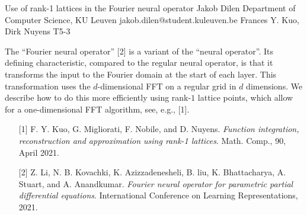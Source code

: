 \begin{talk}
\end{talk}

\begin{talk}
  {Use of rank-1 lattices in the Fourier neural operator}%
  {Jakob Dilen}%
  {Department of Computer Science, KU Leuven}%
  {jakob.dilen@student.kuleuven.be}%
  {Frances Y. Kuo, Dirk Nuyens}%
  {T5-3}%

The ``Fourier neural operator'' [2] is a variant of the ``neural operator''.
Its defining characteristic, compared to the regular neural operator, is that it transforms the input to the Fourier domain at the start of each layer. This transformation uses the $d$-dimensional FFT on a regular grid in $d$ dimensions. We describe how to do this more efficiently using rank-$1$ lattice points, which allow for a one-dimensional FFT algorithm, see, e.g., [1]. 

\medskip
\begin{enumerate}
        \item[{[1]}] F. Y. Kuo, G. Migliorati, F. Nobile, and D. Nuyens. \textit{Function integration,
reconstruction and approximation using rank-1 lattices}. Math. Comp., 90, April
2021.   
        \item[{[2]}] Z. Li, N. B. Kovachki, K. Azizzadenesheli, B. liu, K. Bhattacharya, A. Stuart,
and A. Anandkumar. \textit{Fourier neural operator for parametric partial differential
equations}. International Conference on Learning Representations, 2021.
\end{enumerate}
\end{talk}

